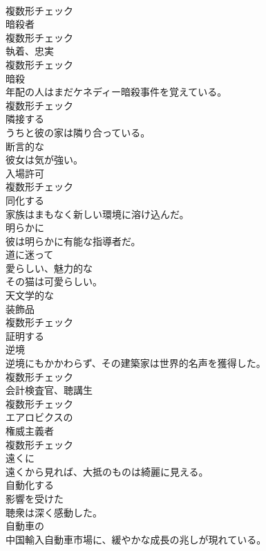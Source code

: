 \documentclass[8pt]{extreport}
\begin{document}
\begin{CJK}{UTF8}{min}
\\	複数形チェック
\\	[名詞]	暗殺者	
\\	複数形チェック
\\	[名詞]	執着、忠実	
\\	複数形チェック
\\	[名詞]	暗殺	
\\	年配の人はまだケネディー暗殺事件を覚えている。	
\\	複数形チェック
\\	[形容詞]	隣接する	
\\	うちと彼の家は隣り合っている。	
\\	[形容詞]	断言的な	
\\	彼女は気が強い。	
\\	[名詞]	入場許可	
\\	複数形チェック
\\	[動詞]	同化する	
\\	家族はまもなく新しい環境に溶け込んだ。	
\\	[副詞]	明らかに	
\\	彼は明らかに有能な指導者だ。	
\\	[副詞]	道に迷って	
\\	[形容詞]	愛らしい、魅力的な	
\\	その猫は可愛らしい。	
\\	[形容詞]	天文学的な	
\\	[名詞]	装飾品	
\\	複数形チェック
\\	[動詞]	証明する	
\\	[名詞]	逆境	
\\	逆境にもかかわらず、その建築家は世界的名声を獲得した。	
\\	複数形チェック
\\	[名詞]	会計検査官、聴講生	
\\	複数形チェック
\\	[形容詞]	エアロビクスの	
\\	[名詞]	権威主義者	
\\	複数形チェック
\\	[副詞]	遠くに	
\\	遠くから見れば、大抵のものは綺麗に見える。	
\\	[動詞]	自動化する	
\\	[形容詞]	影響を受けた	
\\	聴衆は深く感動した。	
\\	[形容詞]	自動車の	
\\	中国輸入自動車市場に、緩やかな成長の兆しが現れている。	

\end{CJK}
\end{document}
